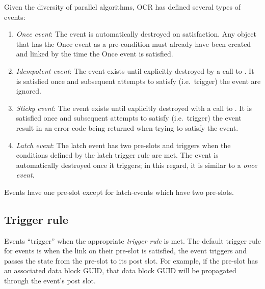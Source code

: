 Given the diversity of parallel algorithms, OCR has defined several
types of events:
\begin{enumerate}
\item \emph{Once event}: The event is automatically
destroyed on satisfaction. Any object that has the Once event as a
pre-condition must already have been created and linked by the time
the Once event is satisfied.

\item \emph{Idempotent event}: The event
exists until explicitly destroyed by a call to
. It is satisfied once and subsequent attempts
to satisfy (i.e.\ trigger) the event are ignored.

\item \emph{Sticky event}: The event exists until
explicitly destroyed with a call to . It is
satisfied once and subsequent attempts to satisfy (i.e.\ trigger) the
event result in an error code being returned when trying to satisfy
the event.
%
%
%
\item \emph{Latch event}: The latch event has two
pre-slots and triggers when the conditions defined by the latch
trigger rule are met. The event is automatically destroyed once it
triggers; in this regard, it is similar to a \emph{once event}.
\end{enumerate}
Events have one pre-slot except for latch-events which have two pre-slots.

\subsection{Trigger rule}
\label{sec:triggerrule}
Events ``trigger'' when the appropriate \emph{trigger
rule} is met. The default trigger rule for events
is when the link on their pre-slot is satisfied, the event triggers
and passes the state from the pre-slot to its post slot. For example,
if the pre-slot has an associated data block GUID, that data block
GUID will be propagated through the event's post slot.


